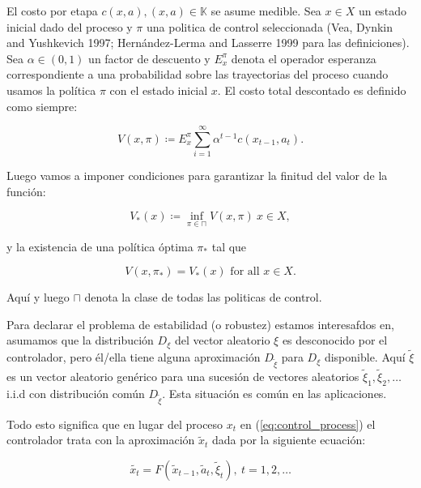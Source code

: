\documentclass[11pt, spanish]{amsart}
\begin{document}
El costo por etapa $c\left(x,a\right),\left(x,a\right)\in\mathbb{K}$
se asume medible. Sea $x\in X$ un estado inicial dado del proceso
y $\pi$ una politica de control seleccionada (Vea, Dynkin and Yushkevich
1997; Hernández-Lerma and Lasserre 1999 para las definiciones). Sea
$\alpha\in\left(0,1\right)$ un factor de descuento y $E_{x}^{\pi}$
denota el operador esperanza correspondiente a una probabilidad sobre
las trayectorias del proceso cuando usamos la política $\pi$ con
el estado inicial $x$. El costo total descontado es definido como
siempre:

\begin{equation}
V\left(x,\pi\right)\coloneqq E_{x}^{\pi}\sum_{i=1}^{\infty}\alpha^{t-1}c\left(x_{t-1},a_{t}\right).\label{eq:total_discounted_cost}
\end{equation}

Luego vamos a imponer condiciones para garantizar la finitud del valor
de la función:

\begin{equation}
V_{*}\left(x\right)\coloneqq\inf_{\pi\in\sqcap}V\left(x,\pi\right)\ x\in X,\label{eq:value_function}
\end{equation}

y la existencia de una política óptima $\pi_{*}$ tal que 

\begin{equation}
V\left(x,\pi_{*}\right)=V_{*}\left(x\right)\text{ for all }x\in X.\label{eq:optimal_policy}
\end{equation}

Aquí y luego $\sqcap$ denota la clase de todas las politicas de control. 

Para declarar el problema de estabilidad (o robustez) estamos interesafdos
en, asumamos que la distribución $D_{\xi}$ del vector aleatorio $\xi$
es desconocido por el controlador, pero él/ella tiene alguna aproximación
$D_{\widetilde{\xi}}$ para $D_{\xi}$ disponible. Aquí $\widetilde{\xi}$
es un vector aleatorio genérico para una sucesión de vectores aleatorios
$\widetilde{\xi}_{1},\widetilde{\xi}_{2},\ldots$ i.i.d con distribución
común $D_{\widetilde{\xi}}$. Esta situación es común en las aplicaciones. 

Todo esto significa que en lugar del proceso $x_{t}$ en (\ref{eq:control_process})
el controlador trata con la aproximación $\widetilde{x}_{t}$ dada
por la siguiente ecuación:

\begin{equation}
\widetilde{x_{t}}=F\left(\widetilde{x}_{t-1},\widetilde{a}_{t},\widetilde{\xi}_{t}\right),\ t=1,2,\ldots\label{eq:aprox_control_process}
\end{equation}
\end{document}
